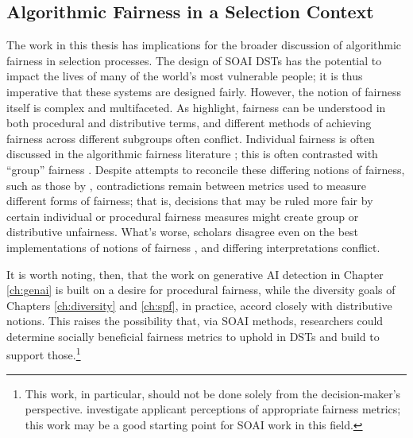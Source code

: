\subsection{Algorithmic Fairness in a Selection Context}\label{ssec:fairness}
The work in this thesis has implications for the broader discussion of algorithmic fairness in selection processes. The design of SOAI DSTs has the potential to impact the lives of many of the world's most vulnerable people; it is thus imperative that these systems are designed fairly. However, the notion of fairness itself is complex and multifaceted. As \textcite{pmlr-v80-kearns18a} highlight, fairness can be understood in both procedural and distributive terms, and different methods of achieving fairness across different subgroups often conflict. Individual fairness is often discussed in the algorithmic fairness literature \cite{dwork_fairness_2012}; this is often contrasted with ``group'' fairness \cite{fleisher_whats_nodate,binns_apparent_2019,barocas2023fairness,Friedler_Scheidegger_Venkatasubramanian_2016}. Despite attempts to reconcile these differing notions of fairness, such as those by \textcite{binns_apparent_2019}, contradictions remain between metrics used to measure different forms of fairness; that is, decisions that may be ruled more fair by certain individual or procedural fairness measures might create group or distributive unfairness. What's worse, scholars disagree even on the best implementations of notions of fairness \cite{Friedler_Scheidegger_Venkatasubramanian_2016,binns_apparent_2019}, and differing interpretations conflict.

It is worth noting, then, that the work on generative AI detection in Chapter \ref{ch:genai} is built on a desire for procedural fairness, while the diversity goals of Chapters \ref{ch:diversity} and \ref{ch:spf}, in practice, accord closely with distributive notions. This raises the possibility that, via SOAI methods, researchers could determine socially beneficial fairness metrics to uphold in DSTs and build to support those.\footnote{This work, in particular, should not be done solely from the decision-maker's perspective. \textcite{10.1145/3351095.3372867} investigate applicant perceptions of appropriate fairness metrics; this work may be a good starting point for SOAI work in this field.}


